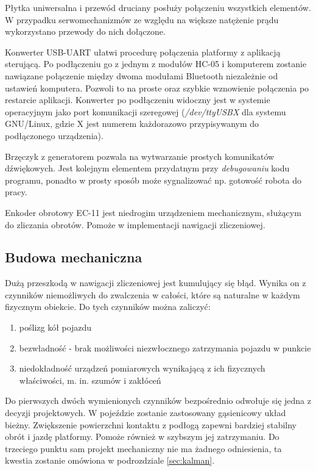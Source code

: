 Płytka uniwersalna i przewód druciany posłuży połączeniu wszystkich elementów. W przypadku serwomechanizmów ze względu na większe natężenie prądu wykorzystano przewody do nich dołączone.

Konwerter USB-UART ułatwi procedurę połączenia platformy z aplikacją sterującą. Po podłączeniu go z jednym z modułów HC-05 i komputerem zostanie nawiązane połączenie między dwoma modułami Bluetooth niezależnie od ustawień komputera. Pozwoli to na proste oraz szybkie wznowienie połączenia po restarcie aplikacji. Konwerter po podłączeniu widoczny jest w systemie operacyjnym jako port komunikacji szeregowej (\emph{/dev/ttyUSBX} dla systemu GNU/Linux, gdzie X jest numerem każdorazowo przypisywanym do podłączonego urządzenia).

Brzęczyk z generatorem pozwala na wytwarzanie prostych komunikatów dźwiękowych. Jest kolejnym elementem przydatnym przy \emph{debugowaniu} kodu programu, ponadto w prosty sposób może sygnalizować np. gotowość robota do pracy.

Enkoder obrotowy EC-11 jest niedrogim urządzeniem mechanicznym, służącym do zliczania obrotów. Pomoże w implementacji nawigacji zliczeniowej.

\subsection{Budowa mechaniczna}
Dużą przeszkodą w nawigacji zliczeniowej jest kumulujący się błąd. Wynika on z czynników niemożliwych do zwalczenia w całości, które są naturalne w każdym fizycznym obiekcie. Do tych czynników można zaliczyć: 
\begin{enumerate}
    \item poślizg kół pojazdu
    \item bezwładność - brak możliwości niezwłocznego zatrzymania pojazdu w punkcie
    \item niedokładność urządzeń pomiarowych wynikającą z ich fizycznych właściwości, m. in. szumów i zakłóceń
\end{enumerate}

Do pierwszych dwóch wymienionych czynników bezpośrednio odwołuje się jedna z decyzji projektowych. W pojeździe zostanie zastosowany gąsienicowy układ bieżny. Zwiększenie powierzchni kontaktu z podłogą zapewni bardziej stabilny obrót i jazdę platformy. Pomoże również w szybszym jej zatrzymaniu. Do trzeciego punktu sam projekt mechaniczny nie ma żadnego odniesienia, ta kwestia zostanie omówiona w podrozdziale \ref{sec:kalman}.

